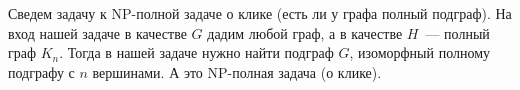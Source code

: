 \begin{task}{2}
Сведем задачу к NP-полной задаче о клике (есть ли у графа полный подграф). На вход нашей задаче в качестве $G$ дадим любой граф, а в качестве $H$~--- полный граф $K_n$. Тогда в нашей задаче нужно найти подграф $G$, изоморфный полному подграфу с $n$ вершинами. А это NP-полная задача (о клике).
\end{task}